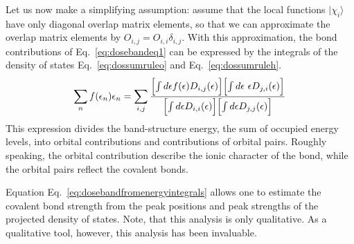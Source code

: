 \documentclass[final,12pt]{article}
\begin{document}
{{{{{{Let us now make a simplifying assumption: assume that the local
functions $|\chi_i\rangle$ have only diagonal overlap matrix elements,
so that we can approximate the overlap matrix elements by
$O_{i,j}=O_{i,i}\delta_{i,j}$.  With this approximation, the bond
contributions of Eq.~\ref{eq:dosebandeq1} can be expressed by the
integrals of the density of states Eq.~\ref{eq:dossumruleo} and
Eq.~\ref{eq:dossumruleh}.
\begin{eqnarray}
\sum_n f(\epsilon_n)\epsilon_n =
\sum_{i,j}\frac{
\Bigl[\int d\epsilon f(\epsilon) D_{i,j}(\epsilon)\Bigr]
\Bigl[\int d\epsilon\ \epsilon  D_{j,i}(\epsilon)\Bigr]
}
{
\Bigl[\int d\epsilon D_{i,i}(\epsilon)\Bigr]
\Bigl[\int d\epsilon  D_{j,j}(\epsilon)\Bigr]
}
\label{eq:dosebandfromenergyintegrals}
\end{eqnarray}
This expression divides the band-structure energy, the sum of occupied
energy levels, into orbital contributions and contributions of orbital
pairs. Roughly speaking, the orbital contribution describe the ionic
character of the bond, while the orbital pairs reflect the covalent
bonds.


Equation Eq.~\ref{eq:dosebandfromenergyintegrals} allows one to
estimate the covalent bond strength from the peak positions and peak
strengths of the projected density of states.  Note, that this
analysis is only qualitative. As a qualitative tool, however, this
analysis has been invaluable.


}}}}}}
\end{document}
